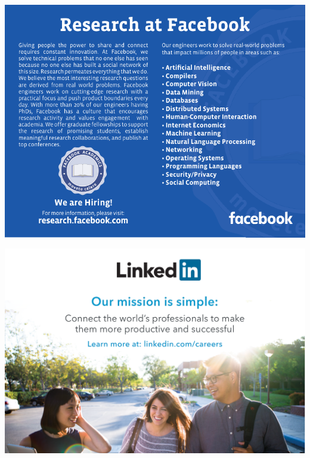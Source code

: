 \begin{center}
\includegraphics[width=1\textwidth]{content/images/ads/facebook}
\par\end{center}

\begin{center}
\includegraphics[width=1\textwidth]{content/images/ads/linkedin} 
\par\end{center}

\begin{center}
\vfill{}

\par\end{center}


